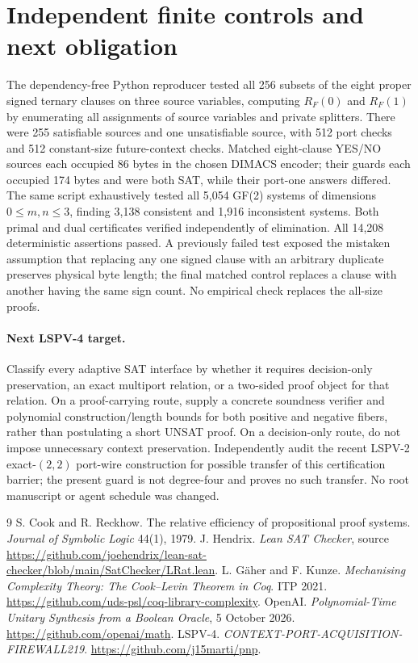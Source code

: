 \documentclass[11pt]{article}
\begin{document}
\section{Independent finite controls and next obligation}
The dependency-free Python reproducer tested all 256 subsets of the eight proper signed ternary clauses on three source variables, computing $R_F(0)$ and $R_F(1)$ by enumerating all assignments of source variables and private splitters. There were 255 satisfiable sources and one unsatisfiable source, with 512 port checks and 512 constant-size future-context checks. Matched eight-clause YES/NO sources each occupied 86 bytes in the chosen DIMACS encoder; their guards each occupied 174 bytes and were both SAT, while their port-one answers differed. The same script exhaustively tested all 5,054 GF(2) systems of dimensions $0\le m,n\le3$, finding 3,138 consistent and 1,916 inconsistent systems. Both primal and dual certificates verified independently of elimination. All 14,208 deterministic assertions passed. A previously failed test exposed the mistaken assumption that replacing any one signed clause with an arbitrary duplicate preserves physical byte length; the final matched control replaces a clause with another having the same sign count. No empirical check replaces the all-size proofs.

\paragraph{Next LSPV-4 target.} Classify every adaptive SAT interface by whether it requires decision-only preservation, an exact multiport relation, or a two-sided proof object for that relation. On a proof-carrying route, supply a concrete soundness verifier and polynomial construction/length bounds for both positive and negative fibers, rather than postulating a short UNSAT proof. On a decision-only route, do not impose unnecessary context preservation. Independently audit the recent LSPV-2 exact-$(2,2)$ port-wire construction for possible transfer of this certification barrier; the present guard is not degree-four and proves no such transfer. No root manuscript or agent schedule was changed.

\begin{thebibliography}{9}
 S. Cook and R. Reckhow. The relative efficiency of propositional proof systems. \emph{Journal of Symbolic Logic} 44(1), 1979.
 J. Hendrix. \emph{Lean SAT Checker}, source \url{https://github.com/joehendrix/lean-sat-checker/blob/main/SatChecker/LRat.lean}.
 L. G\"aher and F. Kunze. \emph{Mechanising Complexity Theory: The Cook--Levin Theorem in Coq}. ITP 2021. \url{https://github.com/uds-psl/coq-library-complexity}.
 OpenAI. \emph{Polynomial-Time Unitary Synthesis from a Boolean Oracle}, 5 October 2026. \url{https://github.com/openai/math}.
 LSPV-4. \emph{CONTEXT-PORT-ACQUISITION-FIREWALL219}. \url{https://github.com/j15marti/pnp}.
\end{thebibliography}
\end{document}
